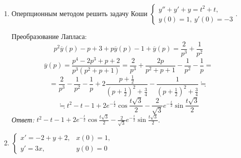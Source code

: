 \documentclass[14pt, a4paper, titlepage, fleqn]{extarticle}
\begin{document}
\begin{enumerate}
            \item Оперпционным методом решить задачу Коши \( \begin{cases}
                y'' + y' + y = t^2 + t, \\
                y(0)=1, ~ y'(0) = -3
            \end{cases}  \).

            Преобразование Лапласа:
            \[
                p^2 \overline{y}(p) - p + 3 + p \overline{y}(p) - 1 + \overline{y}(p) = \frac{2}{p^3} + \frac{1}{p^2}
            \]
            \[
                \overline{y}(p) = \frac{p^4-2p^3+p+2}{p^3(p^2+p+1)} = \frac{2}{p^3} + \frac{2p}{p^2+p+1}-\frac{1}{p^2}-\frac{1}{p} =
            \]
            \[
                = \frac{2}{p^3} -\frac{1}{p^2}-\frac{1}{p} + 2\frac{p+\frac{1}{2}}{(p+\frac{1}{2})^2 + \frac{3}{4}} - \frac{1}{(p+\frac{1}{2})^2 + \frac{3}{4}} \fallingdotseq
            \]
            \[
                \fallingdotseq t^2 - t - 1 + 2e^{-\frac{t}{2}}\cos \frac{t \sqrt{3}}{2} - \frac{2}{\sqrt{3}} e^{-\frac{t}{2}}\sin \frac{t \sqrt{3}}{2}
            \]
            \textit{Ответ:} \( t^2 - t - 1 + 2e^{-\frac{t}{2}}\cos \frac{t \sqrt{3}}{2} - \frac{2}{\sqrt{3}} e^{-\frac{t}{2}}\sin \frac{t \sqrt{3}}{2} \).


            \item \( \begin{cases}
                x' = -2 + y + 2, & x(0)=1, \\
                y' = 3x, & y(0)=0
            \end{cases} \)


\end{enumerate}
\end{document}
